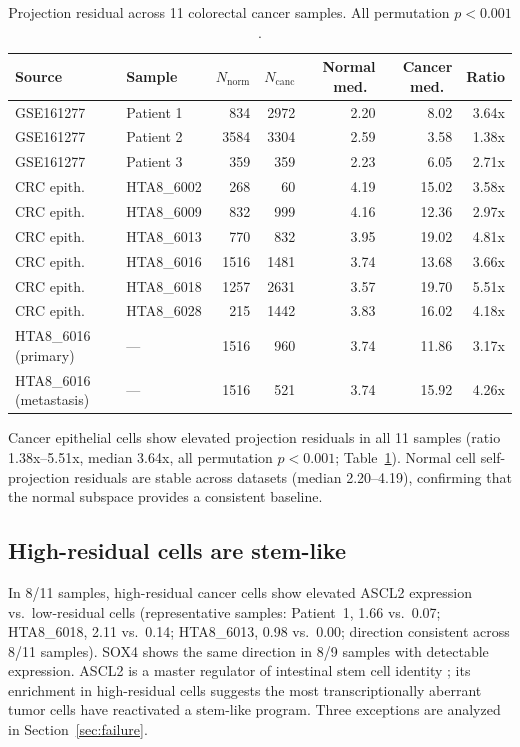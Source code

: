 \documentclass{article}
\begin{document}
\begin{table}[h]
\caption{Projection residual across 11 colorectal cancer samples. All permutation $p<0.001$.}
\label{tab:residual}
\centering
\small
\begin{tabular}{llrrrrr}
\toprule
Source & Sample & $N_\text{norm}$ & $N_\text{canc}$ & Normal med.\ & Cancer med.\ & Ratio \\
\midrule
GSE161277 & Patient 1 & 834 & 2972 & 2.20 & 8.02 & 3.64x \\
GSE161277 & Patient 2 & 3584 & 3304 & 2.59 & 3.58 & 1.38x \\
GSE161277 & Patient 3 & 359 & 359 & 2.23 & 6.05 & 2.71x \\
CRC epith.\ & HTA8\_6002 & 268 & 60 & 4.19 & 15.02 & 3.58x \\
CRC epith.\ & HTA8\_6009 & 832 & 999 & 4.16 & 12.36 & 2.97x \\
CRC epith.\ & HTA8\_6013 & 770 & 832 & 3.95 & 19.02 & 4.81x \\
CRC epith.\ & HTA8\_6016 & 1516 & 1481 & 3.74 & 13.68 & 3.66x \\
CRC epith.\ & HTA8\_6018 & 1257 & 2631 & 3.57 & 19.70 & 5.51x \\
CRC epith.\ & HTA8\_6028 & 215 & 1442 & 3.83 & 16.02 & 4.18x \\
HTA8\_6016 (primary) & --- & 1516 & 960 & 3.74 & 11.86 & 3.17x \\
HTA8\_6016 (metastasis) & --- & 1516 & 521 & 3.74 & 15.92 & 4.26x \\
\bottomrule
\end{tabular}
\end{table}

Cancer epithelial cells show elevated projection residuals in all 11 samples (ratio 1.38x--5.51x, median 3.64x, all permutation $p<0.001$; Table~\ref{tab:residual}). Normal cell self-projection residuals are stable across datasets (median 2.20--4.19), confirming that the normal subspace provides a consistent baseline.

\subsection{High-residual cells are stem-like}

In 8/11 samples, high-residual cancer cells show elevated ASCL2 expression vs.\ low-residual cells (representative samples: Patient~1, 1.66 vs.\ 0.07; HTA8\_6018, 2.11 vs.\ 0.14; HTA8\_6013, 0.98 vs.\ 0.00; direction consistent across 8/11 samples). SOX4 shows the same direction in 8/9 samples with detectable expression. ASCL2 is a master regulator of intestinal stem cell identity \citep{vanderflier2009}; its enrichment in high-residual cells suggests the most transcriptionally aberrant tumor cells have reactivated a stem-like program. Three exceptions are analyzed in Section~\ref{sec:failure}.
\end{document}
